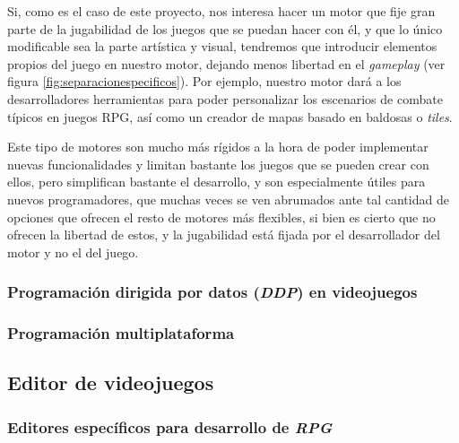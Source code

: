 Si, como es el caso de este proyecto, nos interesa hacer un motor que fije gran parte de la jugabilidad de los juegos que se puedan hacer con él, y que lo único modificable sea la parte artística y visual, tendremos que introducir elementos propios del juego en nuestro motor, dejando menos libertad en el \textit{gameplay} (ver figura \ref{fig:separacionespecificos}). Por ejemplo, nuestro motor dará a los desarrolladores herramientas para poder personalizar los escenarios de combate típicos en juegos RPG, así como un creador de mapas basado en baldosas o \textit{tiles}. 

\smallskip

Este tipo de motores son mucho más rígidos a la hora de poder implementar nuevas funcionalidades y limitan bastante los juegos que se pueden crear con ellos, pero simplifican bastante el desarrollo, y son especialmente útiles para nuevos programadores, que muchas veces se ven abrumados ante tal cantidad de opciones que ofrecen el resto de motores más flexibles, si bien es cierto que no ofrecen la libertad de estos, y la jugabilidad está fijada por el desarrollador del motor y no el del juego.

\subsubsection{Programación dirigida por datos (\textit{DDP}) en videojuegos}

\subsubsection{Programación multiplataforma}

\subsection{Editor de videojuegos}

\subsubsection{Editores específicos para desarrollo de \textit{RPG}}

